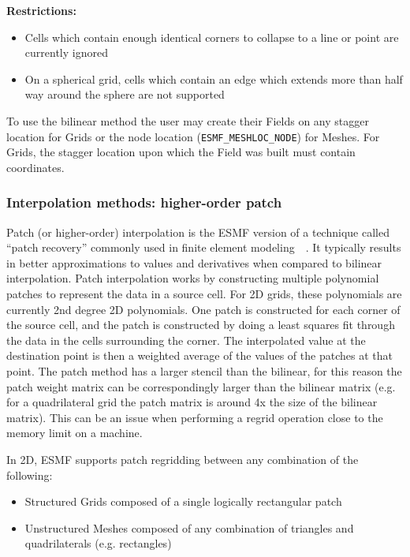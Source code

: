 \smallskip

{\bf Restrictions:}
 \begin{itemize}
 \item Cells which contain enough identical corners to collapse to a line or point are currently ignored
 \item On a spherical grid, cells which contain an edge which extends more than half way around the sphere are not supported 
 \end{itemize}

 To use the bilinear method the user may create their Fields on any stagger location for Grids or the node location ({\tt ESMF\_MESHLOC\_NODE}) for Meshes.
 For Grids, the stagger location upon which the Field was built must contain coordinates. 

\subsubsection{Interpolation methods: higher-order patch}\label{sec:interpolation:patch}

 Patch (or higher-order) interpolation is the ESMF version of a technique called ``patch recovery'' commonly
 used in finite element modeling~\cite{PatchInterp1}~\cite{PatchInterp2}. It typically results in better approximations to 
 values and derivatives when compared to bilinear interpolation.
 Patch interpolation works by constructing multiple polynomial patches to represent
 the data in a source cell. For 2D grids, these polynomials
 are currently 2nd degree 2D polynomials. One patch is constructed for each corner of the source cell, and the patch is constructed 
 by doing a least squares fit through the data in the cells surrounding the corner. The interpolated value at the destination point is 
 then a weighted average of the values of the patches at that point. The patch method has a larger
 stencil than the bilinear, for this reason the patch weight matrix can be correspondingly larger
 than the bilinear matrix (e.g. for a quadrilateral grid the patch matrix is around 4x the size of
 the bilinear matrix). This can be an issue when performing a regrid operation close to the memory
 limit on a machine.  

\smallskip

 In 2D, ESMF supports patch regridding between any combination of the following:
 \begin{itemize}
 \item Structured Grids composed of a single logically rectangular patch
 \item Unstructured Meshes composed of any combination of triangles and quadrilaterals (e.g. rectangles)
 \end{itemize}

